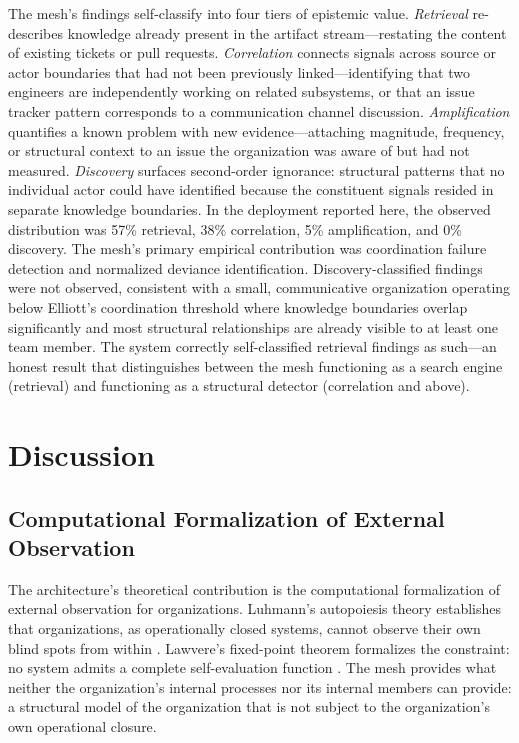 \documentclass[11pt,a4paper]{article}
\begin{document}
The mesh's findings self-classify into four tiers of epistemic value. \emph{Retrieval} re-describes knowledge already present in the artifact stream---restating the content of existing tickets or pull requests. \emph{Correlation} connects signals across source or actor boundaries that had not been previously linked---identifying that two engineers are independently working on related subsystems, or that an issue tracker pattern corresponds to a communication channel discussion. \emph{Amplification} quantifies a known problem with new evidence---attaching magnitude, frequency, or structural context to an issue the organization was aware of but had not measured. \emph{Discovery} surfaces second-order ignorance: structural patterns that no individual actor could have identified because the constituent signals resided in separate knowledge boundaries. In the deployment reported here, the observed distribution was 57\% retrieval, 38\% correlation, 5\% amplification, and 0\% discovery. The mesh's primary empirical contribution was coordination failure detection and normalized deviance identification. Discovery-classified findings were not observed, consistent with a small, communicative organization operating below Elliott's coordination threshold where knowledge boundaries overlap significantly and most structural relationships are already visible to at least one team member. The system correctly self-classified retrieval findings as such---an honest result that distinguishes between the mesh functioning as a search engine (retrieval) and functioning as a structural detector (correlation and above).


\section{Discussion}
\label{sec:discussion}

\subsection{Computational Formalization of External Observation}
\label{sec:incompleteness}

The architecture's theoretical contribution is the computational formalization of external observation for organizations. Luhmann's autopoiesis theory establishes that organizations, as operationally closed systems, cannot observe their own blind spots from within \citep{luhmann1995}. Lawvere's fixed-point theorem formalizes the constraint: no system admits a complete self-evaluation function \citep{lawvere1969}. The mesh provides what neither the organization's internal processes nor its internal members can provide: a structural model of the organization that is not subject to the organization's own operational closure.
\end{document}
